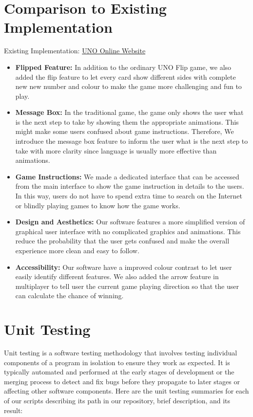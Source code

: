 \documentclass[12pt, titlepage]{article}
\begin{document}
\section{Comparison to Existing Implementation}
Existing Implementation: \href{https://unoonline.io/}{UNO Online Website}
\begin{itemize}
    \item \textbf{Flipped Feature:}
    In addition to the ordinary UNO Flip game, we also added the flip feature to let every card show different sides with complete new new number and colour to make the game more challenging and fun to play.
    \item \textbf{Message Box:} In the traditional game, the game only shows the user what is the next step to take by showing them the appropriate animations. This might make some users confused about game instructions. Therefore, We introduce the message box feature to inform the user what is the next step to take with more clarity since language is usually more effective than animations.
    \item \textbf{Game Instructions:} We made a dedicated interface that can be accessed from the main interface to show the game instruction in details to the users. In this way, users do not have to spend extra time to search on the Internet or blindly playing games to know how the game works.
    \item \textbf{Design and Aesthetics:} Our software features a more simplified version of graphical user interface with no complicated graphics and animations. This reduce the probability that the user gets confused and make the overall experience more clean and easy to follow.
    \item \textbf{Accessibility:} Our software have a improved colour contrast to let user easily identify different features. We also added the arrow feature in multiplayer to tell user the current game playing direction so that the user can calculate the chance of winning. 
\end{itemize}

\section{Unit Testing}
Unit testing is a software testing methodology that involves testing individual components of a program in isolation to ensure they work as expected. It is typically automated and performed at the early stages of development or the merging process to detect and fix bugs before they propagate to later stages or affecting other software components. Here are the unit testing summaries for each of our scripts describing its path in our repository, brief description, and its result:
\end{document}
